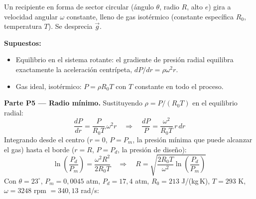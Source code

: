 \documentclass[11pt]{article}
\newenvironment{supuestos}{%
  \noindent\textbf{Supuestos:}
  \begin{itemize}[leftmargin=1.4em, itemsep=1pt]
}{%
  \end{itemize}
}
\begin{document}
\noindent Un recipiente en forma de sector circular (\'angulo $\theta$, radio $R$, alto
$e$) gira a velocidad angular $\omega$ constante, lleno de gas isot\'ermico (constante
espec\'ifica $R_0$, temperatura $T$). Se desprecia $\vec g$.

\begin{supuestos}
\item Equilibrio en el sistema rotante: el gradiente de presi\'on radial equilibra
exactamente la aceleraci\'on centr\'ipeta, $dP/dr=\rho\omega^2r$.
\item Gas ideal, isot\'ermico: $P=\rho R_0T$ con $T$ constante en todo el proceso.
\end{supuestos}

\textbf{Parte P5 --- Radio m\'inimo.} Sustituyendo $\rho=P/(R_0T)$ en el equilibrio
radial:
\begin{equation}
\frac{dP}{dr}=\frac{P}{R_0T}\,\omega^2r
\quad\Longrightarrow\quad
\frac{dP}{P}=\frac{\omega^2}{R_0T}\,r\,dr
\end{equation}
Integrando desde el centro ($r=0$, $P=P_m$, la presi\'on m\'inima que puede alcanzar el
gas) hasta el borde ($r=R$, $P=P_d$, la presi\'on de dise\~no):
\begin{equation}
\ln\!\left(\frac{P_d}{P_m}\right)=\frac{\omega^2R^2}{2R_0T}
\quad\Longrightarrow\quad
\boxed{R=\sqrt{\frac{2R_0T}{\omega^2}\ln\!\left(\frac{P_d}{P_m}\right)}}
\end{equation}
Con $\theta=23^\circ$, $P_m=0{,}0045$ atm, $P_d=17{,}4$ atm, $R_0=213$ J/(kg\,K),
$T=293$ K, $\omega=3248$ rpm $=340{,}13$ rad/s:
\begin{center}
\end{center}
\end{document}
